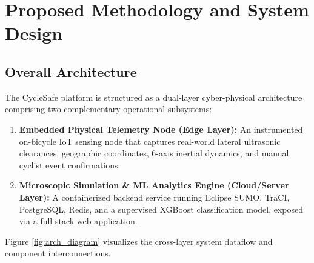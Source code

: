 \chapter{Proposed Methodology and System Design}
\label{chap:methodology}

\section{Overall Architecture}
The CycleSafe platform is structured as a dual-layer cyber-physical architecture comprising two complementary operational subsystems:
\begin{enumerate}
    \item \textbf{Embedded Physical Telemetry Node (Edge Layer):} An instrumented on-bicycle IoT sensing node that captures real-world lateral ultrasonic clearances, geographic coordinates, 6-axis inertial dynamics, and manual cyclist event confirmations.
    \item \textbf{Microscopic Simulation \& ML Analytics Engine (Cloud/Server Layer):} A containerized backend service running Eclipse SUMO, TraCI, PostgreSQL, Redis, and a supervised XGBoost classification model, exposed via a full-stack web application.
\end{enumerate}

Figure \ref{fig:arch_diagram} visualizes the cross-layer system dataflow and component interconnections.

